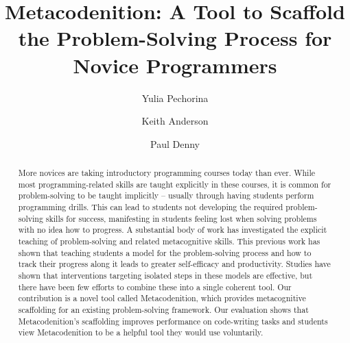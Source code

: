 \documentclass[sigconf,anonymous]{acmart}
\begin{document}
\title{Metacodenition: A Tool to Scaffold the Problem-Solving Process for Novice Programmers}

\author{Yulia Pechorina}

\author{Keith Anderson}

\author{Paul Denny}

\renewcommand{\shortauthors}{Pechorina, Anderson, and Denny}
\renewcommand{\sectionautorefname}{Section}
\renewcommand{\subsectionautorefname}{Section}
\renewcommand{\subsubsectionautorefname}{Section}

\begin{abstract}
    More novices  are taking introductory programming courses today than ever. While most programming-related skills are taught explicitly in these courses, it is common for problem-solving to be taught implicitly – usually through having students perform programming drills. This can lead to students not developing the required problem-solving skills for success, manifesting in students feeling lost when solving problems with no idea how to progress. A substantial body of work has investigated the explicit teaching of problem-solving and related metacognitive skills. This previous work has shown that teaching students a model for the problem-solving process and how to track their progress along it leads to greater self-efficacy and productivity. Studies have shown that interventions targeting isolated steps in these models are effective, but there have been few efforts to combine these into a single coherent tool. Our contribution is a novel tool called Metacodenition, which provides metacognitive scaffolding for an existing problem-solving framework. Our evaluation shows that Metacodenition’s scaffolding improves performance on code-writing tasks and students view Metacodenition to be a helpful tool they would use voluntarily.
\end{abstract}
\end{document}
